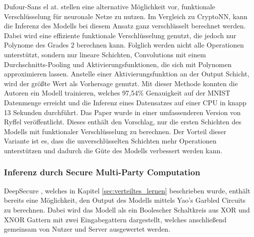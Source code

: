 Dufour-Sans el at. \cite{P-105} stellen eine alternative Möglichkeit vor, funktionale Verschlüsselung für neuronale Netze zu nutzen.
Im Vergleich zu CryptoNN, kann die Inferenz des Modells bei diesem Ansatz ganz verschlüsselt berechnet werden.
Dabei wird eine effiziente funktionale Verschlüsselung genutzt, die jedoch nur Polynome des Grades 2 berechnen kann.
Folglich werden nicht alle Operationen unterstützt, sondern nur lineare Schichten, Convolutions mit einem Durchschnitts-Pooling und Aktivierungsfunktionen, die sich mit Polynomen approximieren lassen.
Anstelle einer Aktivierungsfunktion an der Output Schicht, wird der größte Wert als Vorhersage genutzt.
Mit dieser Methode konnten die Autoren ein Modell trainieren, welches 97,54\% Genauigkeit auf der MNIST Datenmenge \cite{D-MNIST} erreicht und die Inferenz eines Datensatzes auf einer CPU in knapp 13 Sekunden durchführt.
Das Paper wurde in einer umfassenderen Version von Ryffel \etal \cite{P-46} veröffentlicht.
Dieses enthält den Vorschlag, nur die ersten Schichten des Modells mit funktionaler Verschlüsselung zu berechnen. 
Der Vorteil dieser Variante ist es, dass die unverschlüsselten Schichten mehr Operationen unterstützen und dadurch die Güte des Modells verbessert werden kann.

\subsubsection*{Inferenz durch Secure Multi-Party Computation}
DeepSecure \cite{P-71}, welches in Kapitel \ref{sec:verteiltes_lernen} beschrieben wurde, enthält bereits eine Möglichkeit, den Output des Modells mittels Yao's Garbled Circuits zu berechnen.
Dabei wird das Modell als ein Boolescher Schaltkreis aus XOR und XNOR Gattern mit zwei Eingabegattern dargestellt, welches anschließend gemeinsam von Nutzer und Server ausgewertet werden.

